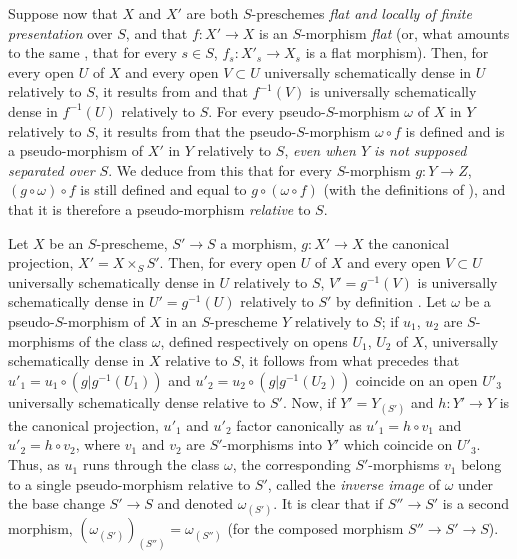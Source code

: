 \begin{env}[20.5.7]
\label{IV.20.5.7}
Suppose now that $X$ and $X'$ are both $S$-preschemes \emph{flat and locally of finite presentation} over $S$, and that $f:X'\to X$ is an $S$-morphism \emph{flat} (or, what amounts to the same , that for every $s\in S$, $f_s:X'_s\to X_s$ is a flat morphism).
Then, for every open $U$ of $X$ and every open $V\subset U$ universally schematically dense in $U$ relatively to $S$, it results from  and  that $f^{-1}(V)$ is universally schematically dense in $f^{-1}(U)$ relatively to $S$.
For every pseudo-$S$-morphism $\omega$ of $X$ in $Y$ relatively to $S$, it results from  that the pseudo-$S$-morphism $\omega\circ f$ is defined and is a pseudo-morphism of $X'$ in $Y$ relatively to $S$, \emph{even when $Y$ is not supposed separated over $S$}.
We deduce from this that for every $S$-morphism $g:Y\to Z$, $(g\circ\omega)\circ f$ is still defined and equal to $g\circ(\omega\circ f)$ (with the definitions of ), and that it is therefore a pseudo-morphism \emph{relative} to $S$.
\end{env}

\begin{env}[20.5.8]
\label{IV.20.5.8}
Let $X$ be an $S$-prescheme, $S'\to S$ a morphism, $g:X'\to X$ the canonical projection, $X'=X\times_S S'$.
Then, for every open $U$ of $X$ and every open $V\subset U$ universally schematically dense in $U$ relatively to $S$, $V'=g^{-1}(V)$ is universally schematically dense in $U'=g^{-1}(U)$ relatively to $S'$ by definition .
Let $\omega$ be a pseudo-$S$-morphism of $X$ in an $S$-prescheme $Y$ relatively to $S$;
if $u_1$, $u_2$ are $S$-morphisms of the class $\omega$, defined respectively on opens $U_1$, $U_2$ of $X$, universally schematically dense in $X$ relative to $S$, it follows from what precedes that $u'_1=u_1\circ(g|g^{-1}(U_1))$ and $u'_2=u_2\circ(g|g^{-1}(U_2))$ coincide on an open $U'_3$ universally schematically dense relative to $S'$.
Now, if $Y'=Y_{(S')}$ and $h:Y'\to Y$ is the canonical projection, $u'_1$ and $u'_2$ factor canonically as $u'_1=h\circ v_1$ and $u'_2=h\circ v_2$, where $v_1$ and $v_2$ are $S'$-morphisms into $Y'$ which coincide on $U'_3$.
Thus, as $u_1$ runs through the class $\omega$, the corresponding $S'$-morphisms $v_1$ belong to a single pseudo-morphism relative to $S'$, called the \emph{inverse image} of $\omega$ under the base change $S'\to S$ and denoted $\omega_{(S')}$.
It is clear that if $S''\to S'$ is a second morphism, $(\omega_{(S')})_{(S'')}=\omega_{(S'')}$ (for the composed morphism $S''\to S'\to S$).
\end{env}

